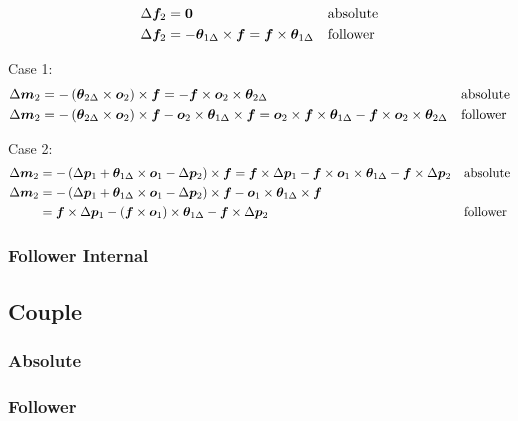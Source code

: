 \begin{align}
	\Delta\bm{f}_2
	&=
	\bm{0}
	&& \text{absolute}
	\\
	\Delta\bm{f}_2
	&=
	- \bm{\theta}_{1\Delta} \times \bm{f}
	=
	\bm{f} \times \bm{\theta}_{1\Delta}
	&& \text{follower}
\end{align}

Case 1:
\begin{align}
	\Delta\bm{m}_2
	&=
	- \left( \bm{\theta}_{2\Delta} \times \bm{o}_2 \right) \times \bm{f}
	=
	- \bm{f} \times \bm{o}_2 \times \bm{\theta}_{2\Delta}
	&& \text{absolute}
	\\
	\Delta\bm{m}_2
	&=
	- \left( \bm{\theta}_{2\Delta} \times \bm{o}_2 \right) \times \bm{f} - \bm{o}_2 \times \bm{\theta}_{1\Delta} \times \bm{f}
	=
	\bm{o}_2 \times \bm{f} \times \bm{\theta}_{1\Delta} - \bm{f} \times \bm{o}_2 \times \bm{\theta}_{2\Delta}
	&& \text{follower}
\end{align}

Case 2:
\begin{align}
	\Delta\bm{m}_2
	&=
	- \left( \Delta\bm{p}_1 + \bm{\theta}_{1\Delta} \times \bm{o}_1 - \Delta\bm{p}_2 \right) \times \bm{f}
	=
	\bm{f} \times \Delta\bm{p}_1 - \bm{f} \times \bm{o}_1 \times \bm{\theta}_{1\Delta} - \bm{f} \times \Delta\bm{p}_2
	&& \text{absolute}
	\\
	\Delta\bm{m}_2
	&=
	- \left( \Delta\bm{p}_1 + \bm{\theta}_{1\Delta} \times \bm{o}_1 - \Delta\bm{p}_2 \right) \times \bm{f} - \bm{o}_1 \times \bm{\theta}_{1\Delta} \times \bm{f}
	\nonumber \\ &
	=
	\bm{f} \times \Delta\bm{p}_1 - \left( \bm{f} \times \bm{o}_1 \right) \times \bm{\theta}_{1\Delta} - \bm{f} \times \Delta\bm{p}_2
	&& \text{follower}
\end{align}


\subsubsection{Follower Internal}

\subsection{Couple}

\subsubsection{Absolute}

\subsubsection{Follower}


